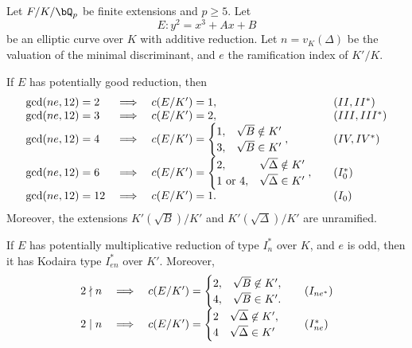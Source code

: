 \begin{lemma}\label{tamagawa-num}
    Let $F /K / \bQ_p$ be finite extensions and $p \geq 5$. Let 
    $$E:  y^2 = x^3 + Ax + B$$
    be an elliptic curve over $K$ with additive reduction. Let $n=v_K(\Delta)$ be the valuation of the minimal discriminant, and $e$ the ramification index of $K'/K$.

    If $E$ has potentially good reduction, then 
        \[
        \begin{array}{l l l l}
            \gcd(ne, 12) = 2 & \implies & c(E / K') = 1, & \quad (II, II^*) \\
            \gcd(ne, 12) = 3 & \implies & c(E / K') = 2, & \quad (III, III^*) \\
            \gcd(ne, 12) = 4 & \implies & c(E / K') = \begin{cases} 1, & \sqrt{B} \notin K'
                                \\ 3, & \sqrt{B} \in K' \end{cases}, & \quad (IV, IV^*) \\
            \gcd(ne, 12) = 6 & \implies & c(E / K') = \begin{cases} 2, & \sqrt{\Delta} \notin K'
                \\ 1 \ \text{or} \ 4, & \sqrt{\Delta} \in K' \end{cases}, & \quad (I_0^*) \\
            \gcd(ne, 12) = 12 & \implies & c(E / K') = 1. & \quad (I_0)
        \end{array}
        \]
    Moreover, the extensions $K'(\sqrt{B}) / K'$ and $K'(\sqrt{\Delta}) / K'$ are unramified.

    If $E$ has potentially multiplicative reduction of type $I_n^*$ over $K$, and $e$ is odd, then it has Kodaira type $I_{en}^*$ over $K'$. Moreover, 
    \[
        \begin{array}{l l l l}
        2 \nmid n & \implies & c(E / K') = \begin{cases} 2, & \sqrt{B} \not\in K', \\ 4, & \sqrt{B} \in K'. \end{cases} & \quad (I_{ne^*}) \\
        2 \mid n & \implies & c(E / K') = \begin{cases} 2 & \sqrt{\Delta} \not\in K', \\ 4 & \sqrt{\Delta} \in K' \end{cases} & \quad ({I_{ne}^*})   
        \end{array} 
    \]
\end{lemma}

